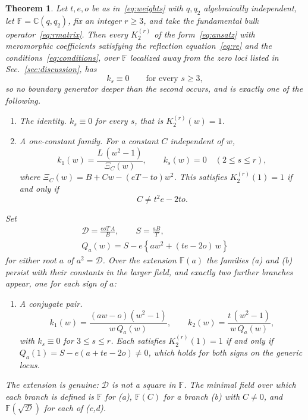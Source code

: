 \documentclass[
  aps,pre,
  reprint,
  superscriptaddress,
  amsmath,amssymb,
  floatfix
]{revtex4-2}
\theoremstyle{plain}
\newtheorem{theorem}{Theorem}
\theoremstyle{definition}
\theoremstyle{remark}
\newcommand{\Fld}{\mathbb{F}}
\newcommand{\Disc}{\mathcal{D}}
\begin{document}
\begin{theorem}
\label{thm:main}
Let $t,e,o$ be as in~\eqref{eq:weights} with $q,q_2$ algebraically independent,
let $\Fld=\mathbb{C}(q,q_2)$, fix an integer $r\ge3$, and take the fundamental
bulk operator~\eqref{eq:rmatrix}. Then every $K_2^{(r)}$ of the
form~\eqref{eq:ansatz} with meromorphic coefficients satisfying the reflection
equation~\eqref{eq:re} and the conditions~\eqref{eq:conditions}, over $\Fld$
localized away from the zero loci listed in Sec.~\ref{sec:discussion}, has
\begin{equation}
  k_s\equiv0\qquad\text{for every }s\ge3 ,
  \label{eq:no-deep}
\end{equation}
so no boundary generator deeper than the second occurs, and is exactly one of
the following.
\begin{enumerate}
\item[\textup{(a)}] \emph{The identity.} $k_s\equiv0$ for every $s$, that is
$K_2^{(r)}(w)=1$.
\item[\textup{(b)}] \emph{A one-constant family.} For a constant $C$
independent of $w$,
\begin{equation}
  k_1(w)=\frac{L\,(w^2-1)}{\Xi_C(w)},\qquad
  k_s(w)=0\quad(2\le s\le r),
  \label{eq:free-family}
\end{equation}
where $\Xi_C(w)=B+Cw-(eT-to)w^2$. This satisfies $K_2^{(r)}(1)=1$ if and only
if
\begin{equation}
  C\ne t^2e-2to .
  \label{eq:free-normalization}
\end{equation}
\end{enumerate}
Set
\begin{equation}
  \begin{gathered}
  \Disc=\frac{eoT\,A}{B},\qquad S=\frac{aB}{T},\\
  Q_a(w)=S-e\left\{a w^2+(te-2o)\,w\right\}
  \end{gathered}
  \label{eq:disc}
\end{equation}
for either root $a$ of $a^2=\Disc$. Over the extension $\Fld(a)$ the families
\textup{(a)} and \textup{(b)} persist with their constants in the larger field,
and exactly two further branches appear, one for each sign of $a$:
\begin{enumerate}
\item[\textup{(c,d)}] \emph{A conjugate pair.}
\begin{equation}
  k_1(w)=\frac{(a w-o)(w^2-1)}{w\,Q_a(w)},\qquad
  k_2(w)=\frac{t\,(w^2-1)}{w\,Q_a(w)},
  \label{eq:algebraic-branch}
\end{equation}
with $k_s\equiv0$ for $3\le s\le r$. Each satisfies $K_2^{(r)}(1)=1$ if and
only if $Q_a(1)=S-e(a+te-2o)\ne0$, which holds for both signs on the generic
locus.
\end{enumerate}
The extension is genuine: $\Disc$ is not a square in $\Fld$. The minimal field
over which each branch is defined is $\Fld$ for \textup{(a)}, $\Fld(C)$ for a
branch \textup{(b)} with $C\neq 0$, and $\Fld(\sqrt{\Disc})$ for each of
\textup{(c,d)}.
\end{theorem}
\end{document}
